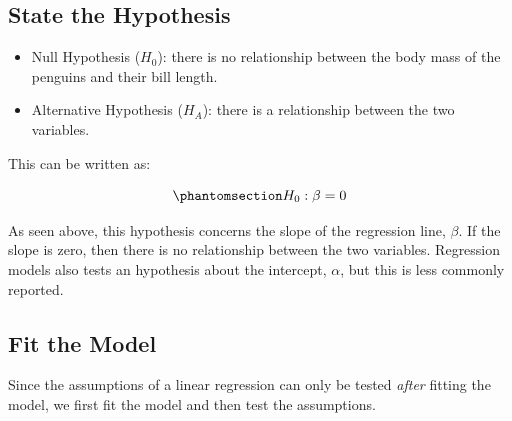 \documentclass[
  letterpaper,
]{book}
\providecommand{\tightlist}{%
  \setlength{\itemsep}{0pt}\setlength{\parskip}{0pt}}\usepackage{longtable,booktabs,array}
\begin{document}
\subsection{State the Hypothesis}\label{state-the-hypothesis}

\begin{itemize}
\tightlist
\item
  Null Hypothesis (\(H_0\)): there is no relationship between the body
  mass of the penguins and their bill length.
\item
  Alternative Hypothesis (\(H_A\)): there is a relationship between the
  two variables.
\end{itemize}

This can be written as:

\begin{equation}\phantomsection\label{eq-h0}{H_{0}:\beta = 0}\end{equation}

As seen above, this hypothesis concerns the slope of the regression
line, \(\beta\). If the slope is zero, then there is no relationship
between the two variables. Regression models also tests an hypothesis
about the intercept, \(\alpha\), but this is less commonly reported.

\subsection{Fit the Model}\label{sec-fit-model}

Since the assumptions of a linear regression can only be tested
\emph{after} fitting the model, we first fit the model and then test the
assumptions.
\end{document}
